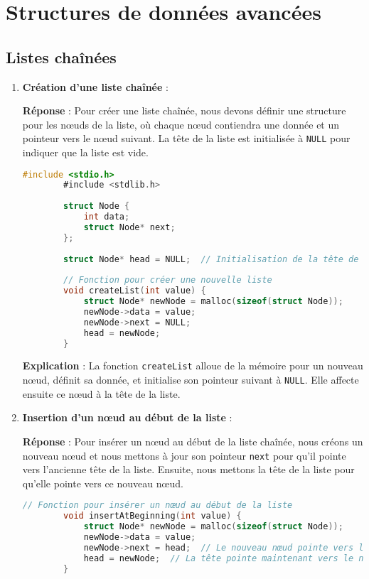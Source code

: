 \section{Structures de données avancées}

\subsection{Listes chaînées}

\begin{enumerate}
	\item \textbf{Création d'une liste chaînée} :
	
	\textbf{Réponse} :
	Pour créer une liste chaînée, nous devons définir une structure pour les nœuds de la liste, où chaque nœud contiendra une donnée et un pointeur vers le nœud suivant. La tête de la liste est initialisée à \texttt{NULL} pour indiquer que la liste est vide.
	
	\begin{lstlisting}[language=C]
		#include <stdio.h>
		#include <stdlib.h>
		
		struct Node {
			int data;
			struct Node* next;
		};
		
		struct Node* head = NULL;  // Initialisation de la tête de la liste à NULL
		
		// Fonction pour créer une nouvelle liste
		void createList(int value) {
			struct Node* newNode = malloc(sizeof(struct Node));
			newNode->data = value;
			newNode->next = NULL;
			head = newNode;
		}
	\end{lstlisting}
	
	\textbf{Explication} :
	La fonction \texttt{createList} alloue de la mémoire pour un nouveau nœud, définit sa donnée, et initialise son pointeur suivant à \texttt{NULL}. Elle affecte ensuite ce nœud à la tête de la liste.
	
	\item \textbf{Insertion d'un nœud au début de la liste} :
	
	\textbf{Réponse} :
	Pour insérer un nœud au début de la liste chaînée, nous créons un nouveau nœud et nous mettons à jour son pointeur \texttt{next} pour qu'il pointe vers l'ancienne tête de la liste. Ensuite, nous mettons la tête de la liste pour qu'elle pointe vers ce nouveau nœud.
	
	\begin{lstlisting}[language=C]
		// Fonction pour insérer un nœud au début de la liste
		void insertAtBeginning(int value) {
			struct Node* newNode = malloc(sizeof(struct Node));
			newNode->data = value;
			newNode->next = head;  // Le nouveau nœud pointe vers l'ancienne tête
			head = newNode;  // La tête pointe maintenant vers le nouveau nœud
		}
	\end{lstlisting}
	

\end{enumerate}
